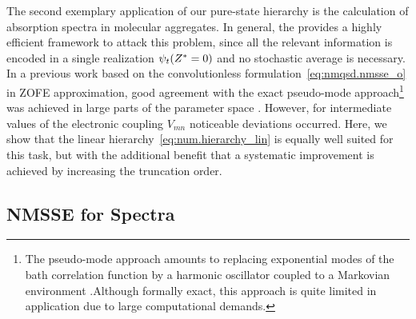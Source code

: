 The second exemplary application of our pure-state hierarchy is the calculation of absorption spectra in molecular aggregates.
In general, the \NMSSE provides a highly efficient framework to attack this problem, since all the relevant information is encoded in a single realization $\psi_t({Z}^* = 0)$ and no stochastic average is necessary.
In a previous work based on the convolutionless formulation~\ref{eq:nmqsd.nmsse_o} in ZOFE approximation, good agreement with the exact pseudo-mode approach\footnote{%
  The pseudo-mode approach amounts to replacing exponential modes of the bath correlation function by a harmonic oscillator coupled to a Markovian environment \cite{Imot94_}.Although formally exact, this approach is quite limited in application due to large computational demands.
}
was achieved in large parts of the parameter space \cite{RoStEi11_nmqsd_aggregats}.
However, for intermediate values of the electronic coupling $V_{mn}$ noticeable deviations occurred.
Here, we show that the linear hierarchy~\ref{eq:num.hierarchy_lin} is equally well suited for this task, but with the additional benefit that a systematic improvement is achieved by increasing the truncation order.


\subsection{NMSSE for Spectra}
\label{sub:app.spectra.nmsse}


